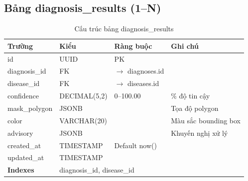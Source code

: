 \documentclass[12pt,a4paper]{article}
\begin{document}
\subsection{Bảng diagnosis\_results (1--N)}
\begin{longtable}{|l|l|l|p{5.5cm}|}
    \caption{Cấu trúc bảng diagnosis\_results}                                                \\
    \hline
    \rowcolor{headerblue}
    \textbf{Trường} & \textbf{Kiểu} & \textbf{Ràng buộc}         & \textbf{Ghi chú}           \\
    \hline
    id              & UUID          & PK                         &                            \\
    \hline
    diagnosis\_id   & FK            & $\rightarrow$ diagnoses.id &                            \\
    \hline
    disease\_id     & FK            & $\rightarrow$ diseases.id  &                            \\
    \hline
    confidence      & DECIMAL(5,2)  & 0--100.00                  & \% độ tin cậy              \\
    \hline
    mask\_polygon   & JSONB         &                            & Tọa độ polygon             \\
    \hline
    color           & VARCHAR(20)   &                            & Màu sắc bounding box       \\
    \hline
    advisory        & JSONB         &                            & Khuyến nghị xử lý          \\
    \hline
    created\_at     & TIMESTAMP     & Default now()              &                            \\
    \hline
    updated\_at     & TIMESTAMP     &                            &                            \\
    \hline
    \rowcolor{headerblue}
    \textbf{Indexes} & \multicolumn{3}{l|}{diagnosis\_id, disease\_id}                          \\
    \hline
\end{longtable}
\end{document}
